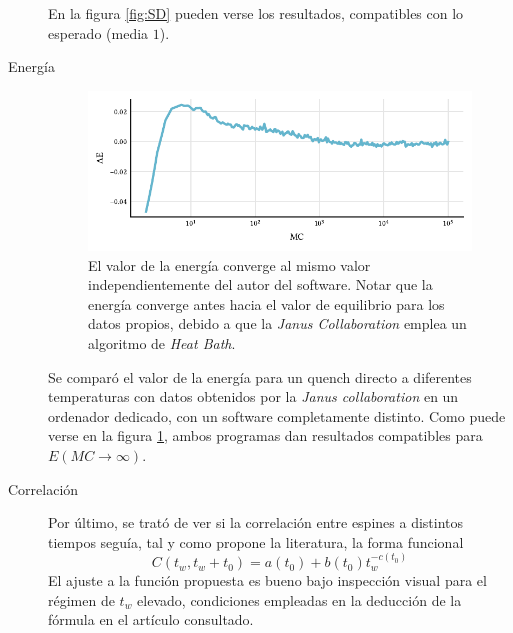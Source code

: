 \begin{description}
  En la figura \ref{fig:SD} pueden verse los resultados, compatibles con
  lo esperado (media $1$).
  \item[Energía]
    \begin{figure}
      \centering
      \includegraphics{../study_cases/sergio_energy/comparison_mini.pdf}
      \caption{El valor de la energía converge al mismo valor
        independientemente del autor del software. Notar que la
        energía converge antes hacia el valor de equilibrio para los
        datos propios, debido a que la \textit{Janus Collaboration}
        emplea un algoritmo de \textit{Heat Bath}.}
      \label{fig:energyvssergio}
    \end{figure}
    Se comparó el valor de la energía para un quench directo a
    diferentes temperaturas con datos obtenidos por la \textit{Janus
      collaboration} en un ordenador dedicado, con un software completamente
    distinto. Como puede verse en la figura \ref{fig:energyvssergio},
    ambos programas dan resultados compatibles para $E(MC→∞)$.

  \item[Correlación]
  Por último, se trató de ver si la correlación entre espines a
  distintos tiempos seguía, tal y como propone la
  literatura\cite{corrparisi}, la forma funcional
  \begin{equation}
    C(t_w,t_w + t_0) = a(t_0) + b(t_0) t_w ^{-c(t_0)}
  \end{equation}
  El ajuste a la función propuesta es bueno bajo inspección visual
  para el régimen de $t_w$ elevado, condiciones empleadas en la
  deducción de la fórmula en el artículo consultado.
\end{description}



